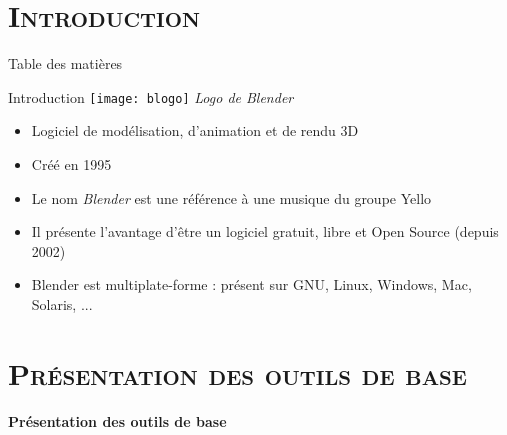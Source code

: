 \documentclass[xcolor=x11names,compress]{beamer}
\renewcommand{\(}{\begin{columns}}
\renewcommand{\)}{\end{columns}}
\newcommand{\<}[1]{\begin{column}{#1}}
\renewcommand{\>}{\end{column}}
\begin{document}
\section{\scshape Introduction}

\begin{frame}{Table des matières}
    \tableofcontents
\end{frame}


\begin{frame}{Introduction}
    \texttt{[image: blogo]} \textit{ Logo de Blender}
    \vspace{0.5cm}
    \begin{itemize}
        \item Logiciel de modélisation, d'animation et de rendu 3D
    \item Créé en 1995
    \item Le nom \textit{Blender} est une référence à une musique du groupe Yello
    \item Il présente l'avantage d'être un logiciel gratuit, libre et Open Source (depuis 2002)
    \item Blender est multiplate-forme : présent sur GNU, Linux, Windows, Mac, Solaris, ...
    \end{itemize}
\end{frame}

\section{\scshape Présentation des outils de base}
\begin{frame}[c]{}
    \centering
    \huge
    \textbf{Présentation des outils de base}
\end{frame}
\end{document}
